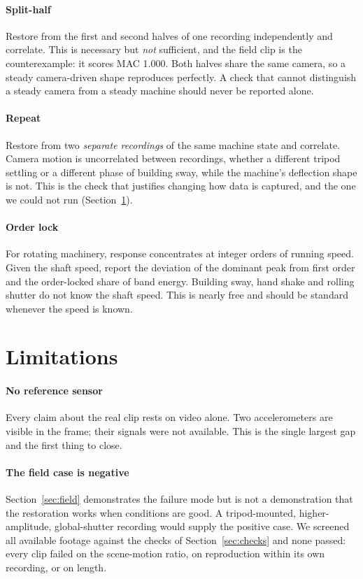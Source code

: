 \documentclass[preprint,12pt]{elsarticle}
\begin{document}
\paragraph{Split-half}
Restore from the first and second halves of one recording independently and
correlate. This is necessary but \emph{not} sufficient, and the field clip
is the counterexample: it scores MAC 1.000. Both halves share the same
camera, so a steady camera-driven shape reproduces perfectly. A check that
cannot distinguish a steady camera from a steady machine should never be
reported alone.

\paragraph{Repeat}
Restore from two \emph{separate recordings} of the same machine state and
correlate. Camera motion is uncorrelated between recordings, whether a
different tripod settling or a different phase of building sway, while the
machine's deflection shape is not. This is the check that justifies changing
how data is captured, and the one we could not run
(Section~\ref{sec:limits}).

\paragraph{Order lock}
For rotating machinery, response concentrates at integer orders of running
speed. Given the shaft speed, report the deviation of the dominant peak from
first order and the order-locked share of band energy. Building sway, hand
shake and rolling shutter do not know the shaft speed. This is nearly free
and should be standard whenever the speed is known.

\section{Limitations}
\label{sec:limits}

\paragraph{No reference sensor}
Every claim about the real clip rests on video alone. Two accelerometers are
visible in the frame; their signals were not available. This is the single
largest gap and the first thing to close.

\paragraph{The field case is negative}
Section~\ref{sec:field} demonstrates the failure mode but is not a
demonstration that the restoration works when conditions are good. A
tripod-mounted, higher-amplitude, global-shutter recording would supply the
positive case. We screened all available footage against the checks of
Section~\ref{sec:checks} and none passed: every clip failed on the
scene-motion ratio, on reproduction within its own recording, or on length.
\end{document}
